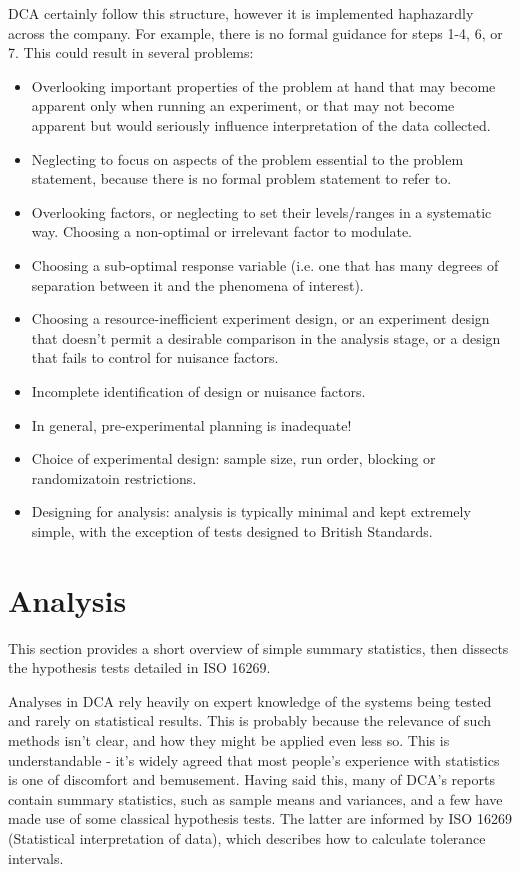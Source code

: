 \documentclass[11pt,a4paper,article]{memoir} %
\begin{document}
DCA certainly follow this structure, however it is implemented haphazardly across the company. For example, there is no formal guidance for steps 1-4, 6, or 7. This could result in several problems:
\begin{itemize}
\item Overlooking important properties of the problem at hand that may become apparent only when running an experiment, or that may not become apparent but would seriously influence interpretation of the data collected.
\item Neglecting to focus on aspects of the problem essential to the problem statement, because there is no formal problem statement to refer to.
\item Overlooking factors, or neglecting to set their levels/ranges in a systematic way. Choosing a non-optimal or irrelevant factor to modulate.
\item Choosing a sub-optimal response variable (i.e. one that has many degrees of separation between it and the phenomena of interest).
\item Choosing a resource-inefficient experiment design, or an experiment design that doesn't permit a desirable comparison in the analysis stage, or a design that fails to control for nuisance factors.
\item Incomplete identification of design or nuisance factors.
\item In general, pre-experimental planning is inadequate!
\item Choice of experimental design: sample size, run order, blocking or randomizatoin restrictions. 
\item Designing for analysis: analysis is typically minimal and kept extremely simple, with the exception of tests designed to British Standards.
\end{itemize}

\section{Analysis}
This section provides a short overview of simple summary statistics, then dissects the hypothesis tests detailed in ISO 16269.
\par
Analyses in DCA rely heavily on expert knowledge of the systems being tested and rarely on statistical results. This is probably because the relevance of such methods isn't clear, and how they might be applied even less so. This is understandable - it's widely agreed that most people's experience with statistics is one of discomfort and bemusement. Having said this, many of DCA's reports contain summary statistics, such as sample means and variances, and a few have made use of some classical hypothesis tests. The latter are informed by ISO 16269 (Statistical interpretation of data), which describes how to calculate tolerance intervals. 
\par
\end{document}
